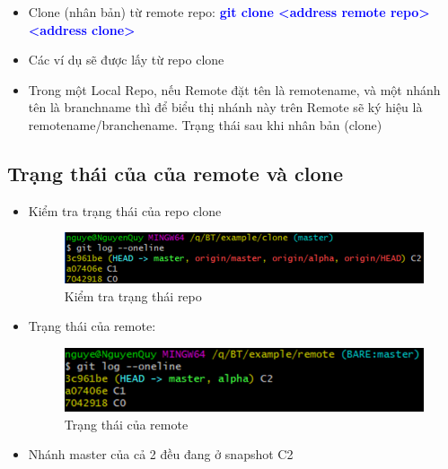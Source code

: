 \documentclass[12pt,a4paper]{report}
\begin{document}
\begin{itemize}
\item Clone (nhân bản) từ remote repo: \textcolor{blue}{\bf git clone <address remote repo> <address clone>}
\item Các ví dụ sẽ được lấy từ repo clone
\item Trong một Local Repo, nếu Remote đặt tên là remotename, và một nhánh tên là branchname thì để biểu thị nhánh này trên Remote sẽ ký hiệu là remotename/branchename. Trạng thái sau khi nhân bản (clone)
\end{itemize}
\subsection{Trạng thái của của remote và clone}
\begin{itemize}
\item Kiểm tra trạng thái của repo clone

\begin{figure}[!ht]
	\centering
 	\includegraphics[width=0.8\linewidth]{screenshot067}
 \caption{Kiểm tra trạng thái repo}
 	\label{fig:screenshot067}
\end{figure}

\item Trạng thái của remote:

\begin{figure}[!ht]
	\centering
 	\includegraphics[width=0.8\linewidth]{screenshot068}
\caption{Trạng thái của remote}
 	\label{fig:screenshot068}
\end{figure}

\item Nhánh master của cả 2 đều đang ở snapshot C2
\end{itemize}
\end{document}
